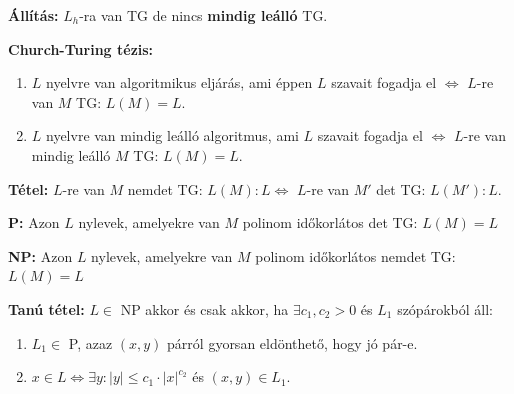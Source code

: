 \documentclass[a4paper]{article}
\begin{document}
\begin{tcolorbox}[size = fbox]
  \textbf{Állítás:} $L_h$-ra van TG de nincs \textbf{mindig leálló} TG.
\end{tcolorbox}

\begin{tcolorbox}[size = fbox]
  \textbf{Church-Turing tézis:} 
  \begin{enumerate}[label=(\roman*)]
    \item $L$ nyelvre van algoritmikus eljárás, ami éppen $L$ szavait fogadja el $\Longleftrightarrow$ $L$-re van $M$ TG: $L(M) = L$.
    \item $L$ nyelvre van mindig leálló algoritmus, ami $L$ szavait fogadja el $\Longleftrightarrow$ $L$-re van mindig leálló $M$ TG: $L(M) = L$.
  \end{enumerate}
\end{tcolorbox}

\begin{tcolorbox}[size = fbox]
  \textbf{Tétel:} $L$-re van $M$ nemdet TG: $L(M): L \Longleftrightarrow$ $L$-re van $M'$ det TG: $L(M'): L$.
\end{tcolorbox}

\begin{tcolorbox}[size = fbox]
  \textbf{P:} Azon $L$ nylevek, amelyekre van $M$ polinom időkorlátos det TG: $L(M) = L$
\end{tcolorbox}

\begin{tcolorbox}[size = fbox]
  \textbf{NP:} Azon $L$ nylevek, amelyekre van $M$ polinom időkorlátos nemdet TG: $L(M) = L$
\end{tcolorbox}

\begin{tcolorbox}[size = fbox]
  \textbf{Tanú tétel:} $L \in $ NP akkor és csak akkor, ha $\exists c_1, c_2 > 0$ és $L_1$ szópárokból áll:
  \begin{enumerate}[label=(\roman*)]
    \item $L_1 \in $ P, azaz $(x, y)$ párról gyorsan eldönthető, hogy jó pár-e.
    \item $x \in L \Longleftrightarrow \exists y: |y| \leq c_1 \cdot |x|^{c_2}$ és $(x, y) \in L_1$. 
  \end{enumerate} 
\end{tcolorbox}
\end{document}
